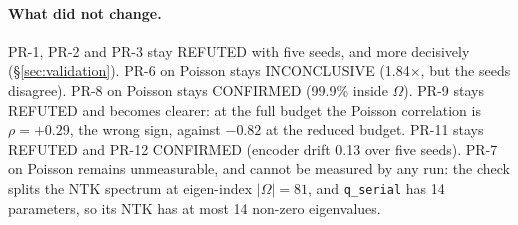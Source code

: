 \paragraph{What did not change.} PR-1, PR-2 and PR-3 stay REFUTED with five seeds, and
more decisively (\S\ref{sec:validation}). PR-6 on Poisson stays INCONCLUSIVE (1.84$\times$,
but the seeds disagree). PR-8 on Poisson stays CONFIRMED (99.9\% inside $\Omega$). PR-9
stays REFUTED and becomes clearer: at the full budget the Poisson correlation is
$\rho=+0.29$, the wrong sign, against $-0.82$ at the reduced budget. PR-11 stays REFUTED
and PR-12 CONFIRMED (encoder drift 0.13 over five seeds). PR-7 on Poisson remains
unmeasurable, and cannot be measured by any run: the check splits the NTK spectrum at
eigen-index $|\Omega|=81$, and \texttt{q\_serial} has 14 parameters, so its NTK has at
most 14 non-zero eigenvalues.
